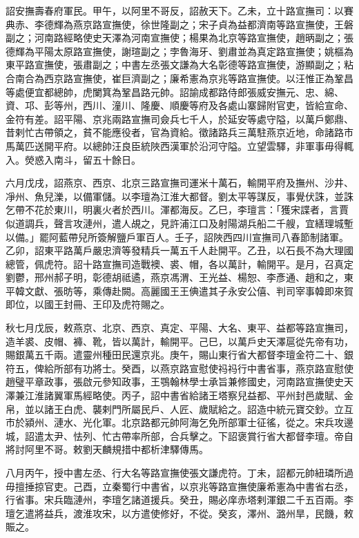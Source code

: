 \begin{pinyinscope}
 詔安撫壽春府軍民。甲午，以阿里不哥反，詔赦天下。乙未，立十路宣撫司：以賽典赤、李德輝為燕京路宣撫使，徐世隆副之；宋子貞為益都濟南等路宣撫使，王磐副之；河南路經略使史天澤為河南宣撫使；楊果為北京等路宣撫使，趙昞副之；張德輝為平陽太原路宣撫使，謝瑄副之；孛魯海牙、劉肅並為真定路宣撫使；姚樞為東平路宣撫使，張肅副之；中書左丞張文謙為大名彰德等路宣撫使，游顯副之；粘合南合為西京路宣撫使，崔巨濟副之；廉希憲為京兆等路宣撫使。以汪惟正為鞏昌等處便宜都總帥，虎闌箕為鞏昌路元帥。詔諭成都路侍郎張威安撫元、忠、綿、資、邛、彭等州，西川、潼川、隆慶、順慶等府及各處山寨歸附官吏，皆給宣命、金符有差。詔平陽、京兆兩路宣撫司僉兵七千人，於延安等處守隘，以萬戶鄭鼎、昔剌忙古帶領之，貧不能應役者，官為資給。徵諸路兵三萬駐燕京近地，命諸路市馬萬匹送開平府。以總帥汪良臣統陜西漢軍於沿河守隘。立望雲驛，非軍事毋得輒入。熒惑入南斗，留五十餘日。



 六月戊戌，詔燕京、西京、北京三路宣撫司運米十萬石，輸開平府及撫州、沙井、凈州、魚兒濼，以備軍儲。以李璮為江淮大都督。劉太平等謀反，事覺伏誅，並誅乞帶不花於東川，明裏火者於西川。渾都海反。乙巳，李璮言：「獲宋諜者，言賈似道調兵，聲言攻漣州，遣人覘之，見許浦江口及射陽湖兵船二千艘，宜繕理城塹以備。」罷阿藍帶兒所簽解鹽戶軍百人。壬子，詔陜西四川宣撫司八春節制諸軍。乙卯，詔東平路萬戶嚴忠濟等發精兵一萬五千人赴開平。乙丑，以石長不為大理國總管，佩虎符。詔十路宣撫司造戰襖、裘、帽，各以萬計，輸開平。是月，召真定劉鬱，邢州郝子明，彰德胡祗遹，燕京馮渭、王光益、楊恕、李彥通、趙和之，東平韓文獻、張昉等，乘傳赴闕。高麗國王王倎遣其子永安公僖、判司宰事韓即來賀即位，以國王封冊、王印及虎符賜之。



 秋七月戊辰，敕燕京、北京、西京、真定、平陽、大名、東平、益都等路宣撫司，造羊裘、皮帽、褲、靴，皆以萬計，輸開平。己巳，以萬戶史天澤扈從先帝有功，賜銀萬五千兩。遣靈州種田民還京兆。庚午，賜山東行省大都督李璮金符二十、銀符五，俾給所部有功將士。癸酉，以燕京路宣慰使祃祃行中書省事，燕京路宣慰使趙璧平章政事，張啟元參知政事，王鶚翰林學士承旨兼修國史，河南路宣撫使史天澤兼江淮諸翼軍馬經略使。丙子，詔中書省給諸王塔察兒益都、平州封邑歲賦、金帛，並以諸王白虎、襲剌門所屬民戶、人匠、歲賦給之。詔造中統元寶交鈔。立互市於潁州、漣水、光化軍。北京路都元帥阿海乞免所部軍士征徭，從之。宋兵攻邊城，詔遣太尹、怯列、忙古帶率所部，合兵擊之。下詔褒賞行省大都督李璮。帝自將討阿里不哥。敕劉天麟規措中都析津驛傳馬。



 八月丙午，授中書左丞、行大名等路宣撫使張文謙虎符。丁未，詔都元帥紐璘所過毋擅捶掠官吏。己酉，立秦蜀行中書省，以京兆等路宣撫使廉希憲為中書省右丞，行省事。宋兵臨漣州，李璮乞諸道援兵。癸丑，賜必庠赤塔剌渾銀二千五百兩。李璮乞遣將益兵，渡淮攻宋，以方遣使修好，不從。癸亥，澤州、潞州旱，民饑，敕賑之。




\end{pinyinscope}
